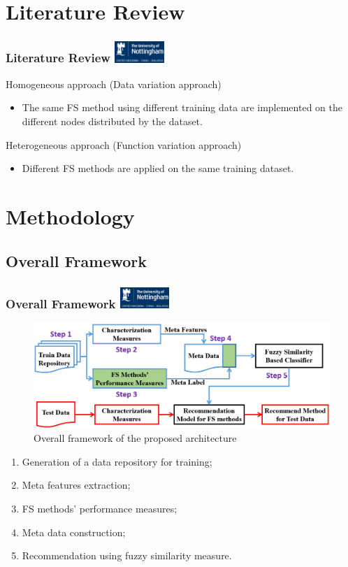 \documentclass[aspectratio=1610]{beamer}
\newcommand{\UoN}
  {\hfill {\includegraphics[height=0.8cm]{nott_logo/nott_logo_white.png}}}
\begin{document}
\section{Literature Review}
\begin{frame}
\frametitle{Literature Review \UoN}
	\begin{block}{Homogeneous approach (Data variation approach)}
		\begin{itemize}
			\item The same FS method using different training data are implemented on the different nodes distributed by the dataset.
		\end{itemize}
	\end{block}
		
	\begin{block}{Heterogeneous approach (Function variation approach)}
		\begin{itemize}
			\item Different FS methods are applied on the same training dataset.
		\end{itemize}
	\end{block}
\end{frame}


\section{Methodology}
\subsection{Overall Framework}

\begin{frame}
\frametitle{Overall Framework \UoN}
	\begin{figure}
    	\includegraphics[scale=0.33]{Figures/Overall_Framework_step.png}
    	\caption{\scriptsize{Overall framework of the proposed architecture}}
    \end{figure}

  	\begin{enumerate}
  		\item Generation of a data repository for training;
  		\item Meta features extraction;
  		\item FS methods' performance measures;
  		\item Meta data construction;
  		\item Recommendation using fuzzy similarity measure.
  	\end{enumerate}
\end{frame}
\end{document}
